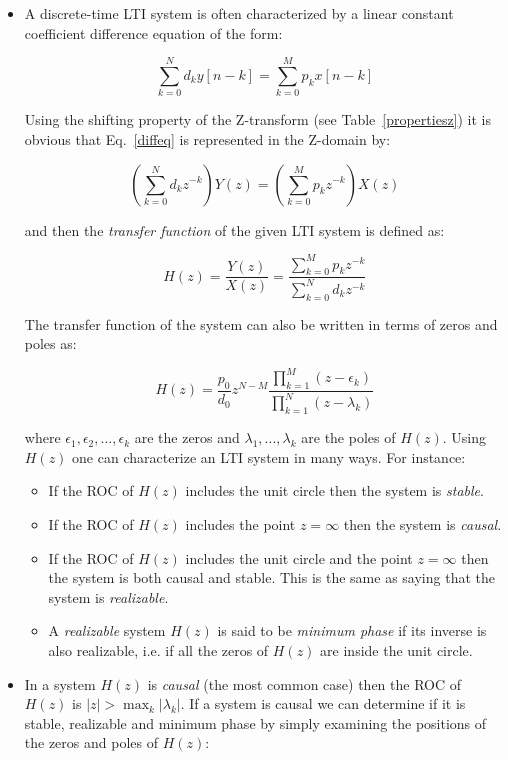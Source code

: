 \documentclass[a4paper,11pt,oneside]{article}
\begin{document}
\begin{itemize}
\item A discrete-time LTI system is often characterized by a linear constant coefficient difference equation of the form:

\begin{equation} \label{diffeq}
\sum_{k=0}^{N}d_{k}y[n-k]=\sum_{k=0}^{M}p_kx[n-k]
\end{equation}


Using the shifting property of the Z-transform (see Table~\ref{propertiesz}) it is obvious that Eq.~\ref{diffeq} is represented in the Z-domain by:

\[
\left(\sum_{k=0}^{N}d_k z^{-k}\right)Y(z)=\left(\sum_{k=0}^{M}p_k z^{-k}\right)X(z)
\]

and then the \emph{transfer function} of the given LTI system is defined as:

\begin{equation}\label{rationalz}
H(z)=\frac{Y(z)}{X(z)}=\frac{\sum_{k=0}^{M}p_k z^{-k}}{\sum_{k=0}^{N}d_k z^{-k}}
\end{equation}

The transfer function of the system can also be written in terms of zeros and poles as:

\[
H(z)=\frac{p_0}{d_{0}}z^{N-M}\frac{\prod_{k=1}^{M}(z-\epsilon_k)}{\prod_{k=1}^{N}(z-\lambda_k)}
\]

where $\epsilon_1,\epsilon_2,...,\epsilon_k$ are the zeros and $\lambda_1,...,\lambda_k$ are the poles of $H(z)$. Using $H(z)$ one can characterize an LTI system in many ways. For instance:
\begin{itemize}
\item If the ROC of $H(z)$ includes the unit circle then the system is \emph{stable}.
\item If the ROC of $H(z)$ includes the point $z=\infty$ then the system is \emph{causal}.
\item If the ROC of $H(z)$ includes the unit circle and the point $z=\infty$ then the system is both causal and stable. This is the same as saying that the system is \emph{realizable}.
\item A \emph{realizable} system $H(z)$ is said to be \emph{minimum phase} if its inverse is also realizable, i.e. if all the zeros of $H(z)$ are inside the unit circle.
\end{itemize}

\item In a system $H(z)$ is \emph{causal} (the most common case) then the ROC of $H(z)$ is  $|z|>\max_k{|\lambda_k|}$. If a system is causal we can determine if it is stable, realizable and minimum phase by simply examining the positions of the zeros and poles of $H(z)$:


\end{itemize}
\end{document}
